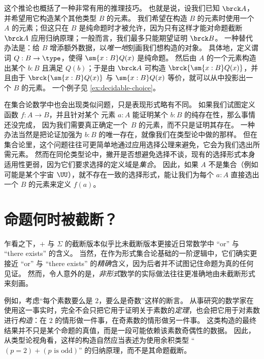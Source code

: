 这个推论也概括了一种非常有用的推理技巧。
也就是说，设我们已知 $\brck A$，并希望用它构造某个其他类型 $B$ 的元素。
我们希望在构造 $B$ 的元素时使用一个 $A$ 的元素；但这只在 $B$ 是纯命题时才被允许，因为只有这样才能对命题截断 $\brck A$ 应用归纳原理；一般而言，我们最多只能期望证明 $\brck B$。
%
一种替代办法是：给 $B$ 增添额外数据，以\emph{唯一地}刻画我们想构造的对象。
具体地，定义谓词 $Q:B\to\type$，使得 $\sm{x:B} Q(x)$ 是纯命题。
然后由 $A$ 的一个元素构造出某个 $b:B$ 且满足 $Q(b)$；于是由 $\brck A$ 可构造 $\brck{\sm{x:B} Q(x)}$，并且由于 $\brck{\sm{x:B} Q(x)}$ 与 $\sm{x:B} Q(x)$ 等价，就可以从中投影出一个 $B$ 的元素。
一个例子见 \cref{ex:decidable-choice}。

在集合论数学中也会出现类似问题，只是表现形式略有不同。
如果我们试图定义函数 $f: A \to B$，并且针对某个
元素 $a : A$ 能证明某个 $b : B$ 的纯存在性，那么事情还没完成，
因为我们需要真正确定一个~$B$ 的元素，而不只是证明其存在。
一种办法当然是把论证加强为 $b : B$ 的唯一存在，就像我们在类型论中做的那样。
但在集合论里，这个问题往往可更简单地通过应用选择公理来避免，它会为我们选出所需元素。
然而在同伦类型论中，撇开是否想避免选择不谈，现有的选择形式本身适用性更弱，因为它们要求选择的定义域是\emph{集合}。
因此，如果 $A$ 不是集合（例如可能是某个宇宙 $\UU$），就不存在一致的选择形式，能让我们为每个 $a : A$ 直接选出一个 $B$ 的元素来定义 $f(a)$。

%


\section{命题何时被截断？}
\label{subsec:when-trunc}

%
%
%

乍看之下，$+$ 与 $\Sigma$ 的截断版本似乎比未截断版本更接近日常数学中 ``or'' 与 ``there exists'' 的含义。
当然，在作为形式集合论基础的一阶逻辑中，它们确实更接近 ``or'' 与 ``there exists'' 的\emph{精确}含义，因为后者并不试图记住命题为真的任何见证。
然而，令人意外的是，\emph{非形式}数学的实际做法往往更准确地由未截断形式来刻画。

%
例如，考虑“每个素数要么是 $2$，要么是奇数”这样的断言。
从事研究的数学家在使用这一事实时，完全不会只把它用于证明关于素数的\emph{定理}，也会把它用于对素数进行\emph{构造}：在 $2$ 的情形做一件事，在奇素数的情形做另一件事。
这类构造的最终结果并不只是某个命题的真值，而是一段可能依赖该素数奇偶性的数据。
因此，从类型论视角看，这样的构造自然应当表述为使用余积类型 ``$(p=2)+(p\text{ is odd})$'' 的归纳原理，而不是其命题截断。


